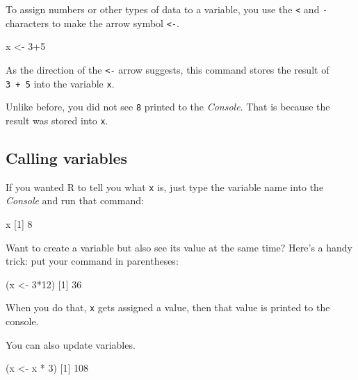 \documentclass[
]{book}
\newenvironment{Shaded}{\begin{snugshade}}{\end{snugshade}}
\newcommand{\DecValTok}[1]{\textcolor[rgb]{0.00,0.00,0.81}{#1}}
\newcommand{\NormalTok}[1]{#1}
\newcommand{\OtherTok}[1]{\textcolor[rgb]{0.56,0.35,0.01}{#1}}
\newcommand{\SpecialCharTok}[1]{\textcolor[rgb]{0.00,0.00,0.00}{#1}}
\begin{document}
To assign numbers or other types of data to a variable, you use the \texttt{\textless{}} and \texttt{-} characters to make the arrow symbol \texttt{\textless{}-}.

\begin{Shaded}
\begin{Highlighting}[]
\NormalTok{x }\OtherTok{\textless{}{-}} \DecValTok{3}\SpecialCharTok{+}\DecValTok{5}
\end{Highlighting}
\end{Shaded}

As the direction of the \texttt{\textless{}-} arrow suggests, this command stores the result of \texttt{3\ +\ 5} into the variable \texttt{x}.

Unlike before, you did not see \texttt{8} printed to the \emph{Console}. That is because the result was stored into \texttt{x}.

\hypertarget{calling-variables}{%
\subsection*{Calling variables}\label{calling-variables}}

If you wanted R to tell you what \texttt{x} is, just type the variable name into the \emph{Console} and run that command:

\begin{Shaded}
\begin{Highlighting}[]
\NormalTok{x}
\NormalTok{[}\DecValTok{1}\NormalTok{] }\DecValTok{8}
\end{Highlighting}
\end{Shaded}

Want to create a variable but also see its value at the same time? Here's a handy trick: put your command in parentheses:

\begin{Shaded}
\begin{Highlighting}[]
\NormalTok{(x }\OtherTok{\textless{}{-}} \DecValTok{3}\SpecialCharTok{*}\DecValTok{12}\NormalTok{)}
\NormalTok{[}\DecValTok{1}\NormalTok{] }\DecValTok{36}
\end{Highlighting}
\end{Shaded}

When you do that, \texttt{x} gets assigned a value, then that value is printed to the console.

You can also update variables.

\begin{Shaded}
\begin{Highlighting}[]
\NormalTok{(x }\OtherTok{\textless{}{-}}\NormalTok{ x }\SpecialCharTok{*} \DecValTok{3}\NormalTok{)}
\NormalTok{[}\DecValTok{1}\NormalTok{] }\DecValTok{108}
\end{Highlighting}
\end{Shaded}
\end{document}
